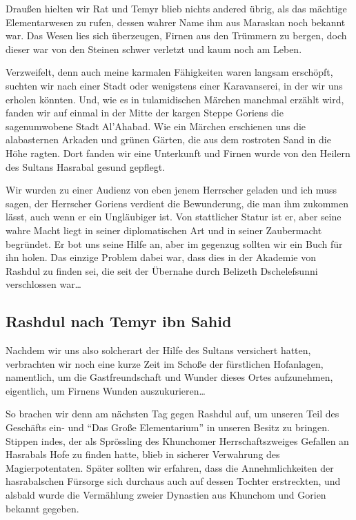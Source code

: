 Draußen hielten wir Rat und Temyr blieb nichts andered übrig, als das mächtige Elementarwesen zu rufen, dessen wahrer Name ihm aus Maraskan noch bekannt war. Das Wesen lies sich überzeugen, Firnen aus den Trümmern zu bergen, doch dieser war von den Steinen schwer verletzt und kaum noch am Leben.

Verzweifelt, denn auch meine karmalen Fähigkeiten waren langsam erschöpft, suchten wir nach einer Stadt oder wenigstens einer Karavanserei, in der wir uns erholen könnten. Und, wie es in tulamidischen Märchen manchmal erzählt wird, fanden wir auf einmal in der Mitte der kargen Steppe Goriens die sagenumwobene Stadt Al'Ahabad. Wie ein Märchen erschienen uns die alabasternen Arkaden und grünen Gärten, die aus dem rostroten Sand in die Höhe ragten. Dort fanden wir eine Unterkunft und Firnen wurde von den Heilern des Sultans Hasrabal gesund gepflegt.

Wir wurden zu einer Audienz von eben jenem Herrscher geladen und ich muss sagen, der Herrscher Goriens verdient die Bewunderung, die man ihm zukommen lässt, auch wenn er ein Ungläubiger ist. Von stattlicher Statur ist er, aber seine wahre Macht liegt in seiner diplomatischen Art und in seiner Zaubermacht begründet. Er bot uns seine Hilfe an, aber im gegenzug sollten wir ein Buch für ihn holen. Das einzige Problem dabei war, dass dies in der Akademie von Rashdul zu finden sei, die seit der Übernahe durch Belizeth Dschelefsunni verschlossen war\dots

\subsection{Rashdul nach Temyr ibn Sahid}

Nachdem wir uns also solcherart der Hilfe des Sultans versichert hatten, verbrachten wir noch eine kurze Zeit im Schoße der fürstlichen Hofanlagen, namentlich, um die Gastfreundschaft und Wunder dieses Ortes aufzunehmen, eigentlich, um Firnens Wunden auszukurieren\dots

So brachen wir denn am nächsten Tag gegen Rashdul auf, um unseren Teil des Geschäfts ein- und ``Das Große Elementarium'' in unseren Besitz zu bringen. Stippen indes, der als Sprössling des Khunchomer Herrschaftszweiges Gefallen an Hasrabals Hofe zu finden hatte, blieb in sicherer Verwahrung des Magierpotentaten. Später sollten wir erfahren, dass die Annehmlichkeiten der hasrabalschen Fürsorge sich durchaus auch auf dessen Tochter erstreckten, und alsbald wurde die Vermählung zweier Dynastien aus Khunchom und Gorien bekannt gegeben.

